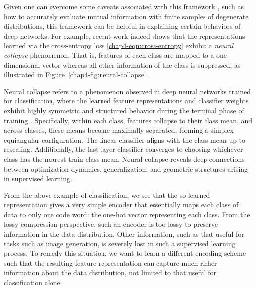 \documentclass[../../book-main.tex]{subfiles}
\begin{document}
Given one can overcome some caveats associated with this framework \cite{kolchinsky2018caveats-ICLR2018}, such as how to accurately evaluate mutual information with finite samples of degenerate distributions, this framework can be helpful in explaining certain behaviors of deep networks. 
For example, recent work \cite{papyan2020prevalence} indeed shows that the representations learned via the cross-entropy loss \eqref{chap4-eqn:cross-entropy} exhibit a \emph{neural collapse} phenomenon. 
That is, features of each class are mapped to a one-dimensional vector whereas all other information of the class is suppressed,  as illustrated in Figure~\ref{chap4-fig:neural-collapse}.
\begin{remark}
    Neural collapse refers to a phenomenon observed in deep neural networks trained for classification, where the learned feature representations and classifier weights exhibit highly symmetric and structured behavior during the terminal phase of training \cite{papyan2020prevalence,zhu2021geometric}. Specifically, within each class, features collapse to their class mean, and across classes, these means become maximally separated, forming a simplex equiangular configuration. The linear classifier aligns with the class mean up to rescaling. Additionally, the last-layer classifier converges to choosing whichever class has the nearest train class mean. Neural collapse reveals deep connections between optimization dynamics, generalization, and geometric structures arising in supervised learning.  
\end{remark}

From the above example of classification, we see that the so-learned representation gives a very simple encoder that essentially maps each class of data to only one code word: the one-hot vector representing each class. From the lossy compression perspective, such an encoder is too lossy to preserve information in the data distribution. Other information, such as that useful for tasks such as image generation, is severely lost in such a supervised learning process. To remedy this situation, we want to learn a different encoding scheme such that the resulting feature representation can capture much richer information about the data distribution, not limited to that useful for classification alone.
\end{document}
